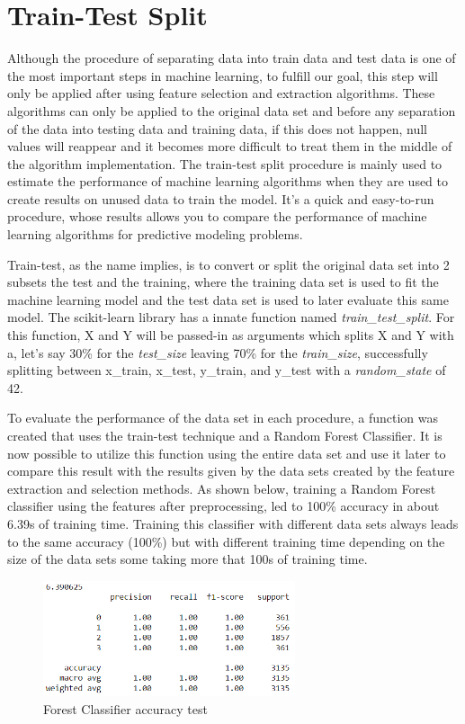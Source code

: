 \section{Train-Test Split} %
\label{sec:test_train_split}
\hspace{10px}Although the procedure of separating data into train data and test data is one of the most important steps in machine learning, to fulfill our goal, this step will only be applied after using feature selection and extraction algorithms. These algorithms can only be applied to the original data set and before any separation of the data into testing data and training data, if this does not happen, null values will reappear and it becomes more difficult to treat them in the middle of the algorithm implementation. The train-test split procedure is mainly used to estimate the performance of machine learning algorithms when they are used to create results on unused data to train the model. It's a quick and easy-to-run procedure, whose results allows you to compare the performance of machine learning algorithms for predictive modeling problems.

Train-test, as the name implies, is to convert or split the original data set into 2 subsets the test and the training, where the training data set is used to fit the machine learning model and the test data set is used to later evaluate this same model. The scikit-learn library has a innate function named \textit{train\_test\_split}. For this function, X and Y will be passed-in as arguments which splits X and Y with a, let's say 30\% for the \textit{test\_size} leaving 70\% for the \textit{train\_size}, successfully splitting between x\_train, x\_test, y\_train, and y\_test with a \textit{random\_state} of 42. 

To evaluate the performance of the data set in each procedure, a function was created that uses the train-test technique and a Random Forest Classifier. It is now possible to utilize this function using the entire data set and use it later to compare this result with the results given by the data sets created by the feature extraction and selection methods. As shown below, training a Random Forest classifier using the features after preprocessing, led to 100\% accuracy in about 6.39s of training time. Training this classifier with different data sets always leads to the same accuracy (100\%) but with different training time depending on the size of the data sets some taking more that 100s of training time.

\begin{figure}[h]
    \centering
    \includegraphics[width=0.66\textwidth,height=0.16\textheight]{Chapters/Figures/forest_test.png}
    \caption{Forest Classifier accuracy test}
\end{figure}


